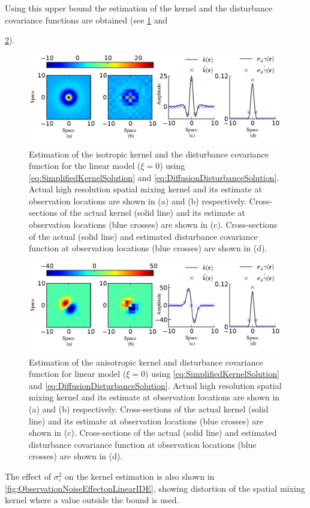 \documentclass[10pt,twocolumn,twoside]{IEEEtran}
\begin{document}
Using this upper bound the estimation of the kernel and the disturbance covariance functions are obtained (see \figurename{\ref{fig:DiffusionIso}} and \figurename{\ref{fig:DifussionAniso}).

\begin{figure}[]
	\centering
		\includegraphics[scale=1]{./Graph/DisturbanceKernelEstimationLinearIso.pdf}
	\caption{Estimation of the isotropic kernel and the disturbance covariance function for the linear model ($\xi=0$) using \eqref{eq:SimplifiedKernelSolution} and \eqref{eq:DiffusionDisturbanceSolution}.
Actual high resolution spatial mixing kernel and its estimate at observation locations are shown in (a) and (b) respectively.
Cross-sections of the actual kernel (solid line) and its estimate at observation locations (blue crosses) are shown in (c).
Cross-sections of the actual (solid line) and estimated  disturbance covariance function at observation locations (blue crosses) are shown in (d).}
	\label{fig:DiffusionIso} 
	\end{figure}
	
\begin{figure}[]
	\centering
		\includegraphics[scale=1]{./Graph/DisturbanceKernelEstimationLinearAniso.pdf}
	\caption{Estimation of the anisotropic kernel and disturbance covariance function for linear model ($\xi=0$) using \eqref{eq:SimplifiedKernelSolution} and \eqref{eq:DiffusionDisturbanceSolution}.
Actual high resolution spatial mixing kernel and its estimate at observation locations are shown in (a) and (b) respectively.
Cross-sections of the actual kernel (solid line) and its estimate at observation locations (blue crosses) are shown in (c).
Cross-sections of the actual (solid line) and estimated  disturbance covariance function at observation locations (blue crosses) are shown in (d).}
	\label{fig:DifussionAniso}
\end{figure}  
The effect of $\sigma_{\varepsilon}^2$ on the kernel estimation is also shown in \figurename{\ref{fig:ObservationNoiseEffectonLinearIDE}}, showing distortion of the spatial mixing kernel where a value outside the bound is used.

}
\end{document}
